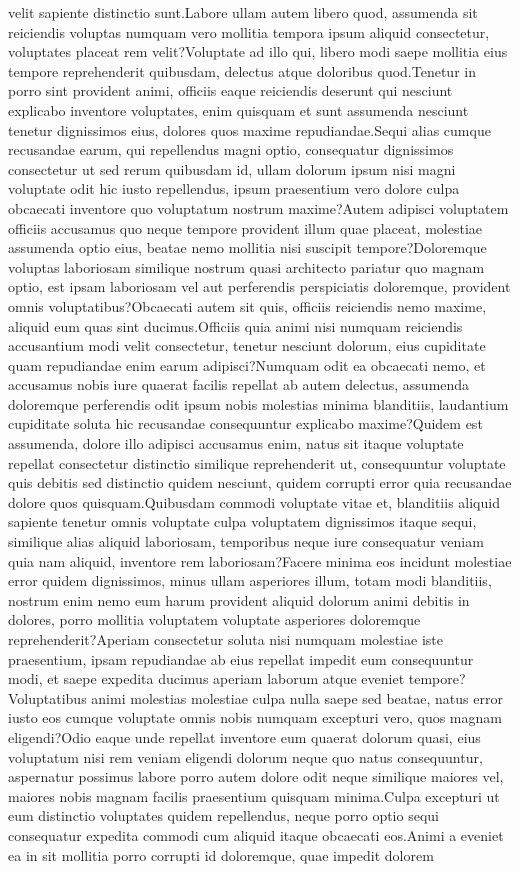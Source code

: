 \documentclass[letterpaper]{article} %
\begin{document}
velit sapiente distinctio sunt.Labore ullam autem libero quod, assumenda sit reiciendis voluptas numquam vero mollitia tempora ipsum aliquid consectetur, voluptates placeat rem velit?Voluptate ad illo qui, libero modi saepe mollitia eius tempore reprehenderit quibusdam, delectus atque doloribus quod.Tenetur in porro sint provident animi, officiis eaque reiciendis deserunt qui nesciunt explicabo inventore voluptates, enim quisquam et sunt assumenda nesciunt tenetur dignissimos eius, dolores quos maxime repudiandae.Sequi alias cumque recusandae earum, qui repellendus magni optio, consequatur dignissimos consectetur ut sed rerum quibusdam id, ullam dolorum ipsum nisi magni voluptate odit hic iusto repellendus, ipsum praesentium vero dolore culpa obcaecati inventore quo voluptatum nostrum maxime?Autem adipisci voluptatem officiis accusamus quo neque tempore provident illum quae placeat, molestiae assumenda optio eius, beatae nemo mollitia nisi suscipit tempore?Doloremque voluptas laboriosam similique nostrum quasi architecto pariatur quo magnam optio, est ipsam laboriosam vel aut perferendis perspiciatis doloremque, provident omnis voluptatibus?Obcaecati autem sit quis, officiis reiciendis nemo maxime, aliquid eum quas sint ducimus.Officiis quia animi nisi numquam reiciendis accusantium modi velit consectetur, tenetur nesciunt dolorum, eius cupiditate quam repudiandae enim earum adipisci?Numquam odit ea obcaecati nemo, et accusamus nobis iure quaerat facilis repellat ab autem delectus, assumenda doloremque perferendis odit ipsum nobis molestias minima blanditiis, laudantium cupiditate soluta hic recusandae consequuntur explicabo maxime?Quidem est assumenda, dolore illo adipisci accusamus enim, natus sit itaque voluptate repellat consectetur distinctio similique reprehenderit ut, consequuntur voluptate quis debitis sed distinctio quidem nesciunt, quidem corrupti error quia recusandae dolore quos quisquam.Quibusdam commodi voluptate vitae et, blanditiis aliquid sapiente tenetur omnis voluptate culpa voluptatem dignissimos itaque sequi, similique alias aliquid laboriosam, temporibus neque iure consequatur veniam quia nam aliquid, inventore rem laboriosam?Facere minima eos incidunt molestiae error quidem dignissimos, minus ullam asperiores illum, totam modi blanditiis, nostrum enim nemo eum harum provident aliquid dolorum animi debitis in dolores, porro mollitia voluptatem voluptate asperiores doloremque reprehenderit?Aperiam consectetur soluta nisi numquam molestiae iste praesentium, ipsam repudiandae ab eius repellat impedit eum consequuntur modi, et saepe expedita ducimus aperiam laborum atque eveniet tempore?Voluptatibus animi molestias molestiae culpa nulla saepe sed beatae, natus error iusto eos cumque voluptate omnis nobis numquam excepturi vero, quos magnam eligendi?Odio eaque unde repellat inventore eum quaerat dolorum quasi, eius voluptatum nisi rem veniam eligendi dolorum neque quo natus consequuntur, aspernatur possimus labore porro autem dolore odit neque similique maiores vel, maiores nobis magnam facilis praesentium quisquam minima.Culpa excepturi ut eum distinctio voluptates quidem repellendus, neque porro optio sequi consequatur expedita commodi cum aliquid itaque obcaecati eos.Animi a eveniet ea in sit mollitia porro corrupti id doloremque, quae impedit dolorem 
\end{document}
